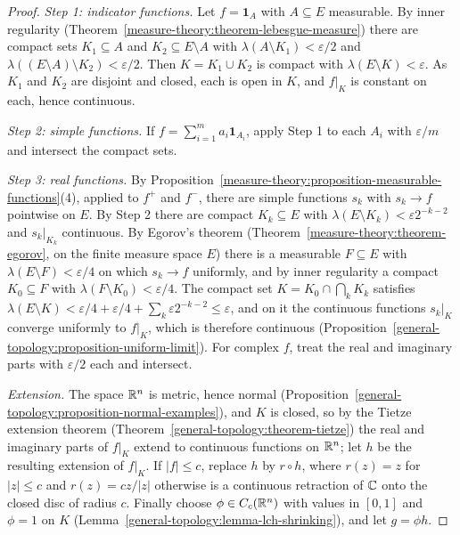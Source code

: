 \begin{proof}
\emph{Step 1: indicator functions.} Let $f = \mathbf{1}_A$ with $A \subseteq E$ measurable. By inner regularity
(Theorem~\ref{measure-theory:theorem-lebesgue-measure}) there are compact sets $K_1 \subseteq A$ and $K_2 \subseteq E \setminus A$ with
$\lambda(A \setminus K_1) < \varepsilon/2$ and $\lambda((E \setminus A) \setminus K_2) < \varepsilon/2$. Then $K = K_1 \cup K_2$ is compact with $\lambda(E \setminus K) < \varepsilon$.
As $K_1$ and $K_2$ are disjoint and closed, each is open in $K$, and $f|_K$ is constant on each, hence continuous.

\emph{Step 2: simple functions.} If $f = \sum_{i=1}^ma_i\mathbf{1}_{A_i}$, apply Step 1 to each $A_i$ with $\varepsilon/m$ and intersect the compact sets.

\emph{Step 3: real functions.} By Proposition~\ref{measure-theory:proposition-measurable-functions}(4), applied to $f^+$ and $f^-$, there are simple functions
$s_k$ with $s_k \to f$ pointwise on $E$. By Step 2 there are compact $K_k \subseteq E$ with $\lambda(E \setminus K_k) < \varepsilon2^{-k-2}$ and $s_k|_{K_k}$
continuous. By Egorov's theorem (Theorem~\ref{measure-theory:theorem-egorov}, on the finite measure space $E$) there is a measurable $F \subseteq E$ with
$\lambda(E \setminus F) < \varepsilon/4$ on which $s_k \to f$ uniformly, and by inner regularity a compact $K_0 \subseteq F$ with $\lambda(F \setminus K_0) < \varepsilon/4$.
The compact set $K = K_0 \cap \bigcap_kK_k$ satisfies $\lambda(E \setminus K) < \varepsilon/4 + \varepsilon/4 + \sum_k\varepsilon2^{-k-2} \leq \varepsilon$, and on it the
continuous functions $s_k|_K$ converge uniformly to $f|_K$, which is therefore continuous (Proposition~\ref{general-topology:proposition-uniform-limit}). For
complex $f$, treat the real and imaginary parts with $\varepsilon/2$ each and intersect.

\emph{Extension.} The space $\mathbb{R}^n$ is metric, hence normal (Proposition~\ref{general-topology:proposition-normal-examples}), and $K$ is closed, so by the Tietze
extension theorem (Theorem~\ref{general-topology:theorem-tietze}) the real and imaginary parts of $f|_K$ extend to continuous functions on $\mathbb{R}^n$; let $h$ be the
resulting extension of $f|_K$. If $|f| \leq c$, replace $h$ by $r \circ h$, where $r(z) = z$ for $|z| \leq c$ and $r(z) = cz/|z|$ otherwise is a continuous retraction
of $\mathbb{C}$ onto the closed disc of radius $c$. Finally choose $\phi \in C_c(\mathbb{R}^n)$ with values in $[0, 1]$ and $\phi = 1$ on $K$
(Lemma~\ref{general-topology:lemma-lch-shrinking}), and let $g = \phi h$.
\end{proof}

